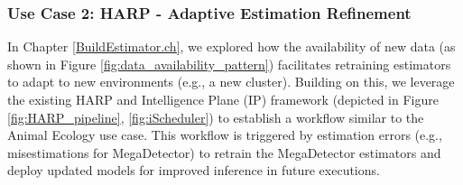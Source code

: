\subsubsection{Use Case 2: HARP - Adaptive Estimation Refinement}
In Chapter \ref{BuildEstimator.ch}, we explored how the availability of new data (as shown in Figure \ref{fig:data_availability_pattern})  facilitates retraining estimators to adapt to new environments (e.g., a new cluster). Building on this, we leverage the existing HARP and Intelligence Plane (IP) framework (depicted in Figure \ref{fig:HARP_pipeline}, \ref{fig:iScheduler}) to establish a workflow similar to the Animal Ecology use case. This workflow is triggered by estimation errors (e.g., misestimations for MegaDetector) to retrain the MegaDetector estimators and deploy updated models for improved inference in future executions.


